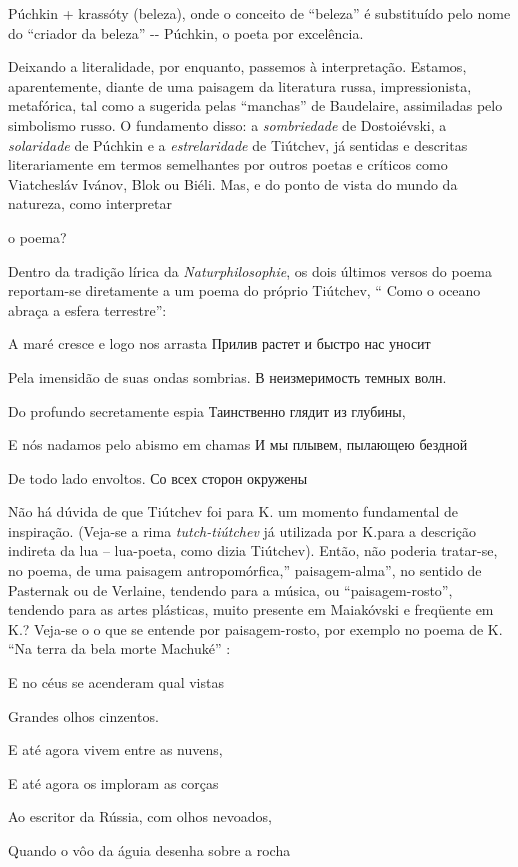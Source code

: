 Púchkin + krassóty (beleza), onde o conceito de ``beleza'' é substituído
pelo nome do ``criador da beleza'' -\/- Púchkin, o poeta por excelência.

Deixando a literalidade, por enquanto, passemos à interpretação.
Estamos, aparentemente, diante de uma paisagem da literatura russa,
impressionista, metafórica, tal como a sugerida pelas ``manchas'' de
Baudelaire, assimiladas pelo simbolismo russo. O fundamento disso: a
\emph{sombriedade} de Dostoiévski, a \emph{solaridade} de Púchkin e a
\emph{estrelaridade} de Tiútchev, já sentidas e descritas literariamente
em termos semelhantes por outros poetas e críticos como Viatchesláv
Ivánov, Blok ou Biéli. Mas, e do ponto de vista do mundo da natureza,
como interpretar

o poema?

Dentro da tradição lírica da \emph{Naturphilosophie}, os dois últimos
versos do poema reportam-se diretamente a um poema do próprio Tiútchev,
`` Como o oceano abraça a esfera terrestre'':

A maré cresce e logo nos arrasta Прилив растет и быстро нас уносит

Pela imensidão de suas ondas sombrias. В неизмеримость темных волн.

Do profundo secretamente espia Таинственно глядит из глубины,

E nós nadamos pelo abismo em chamas И мы плывем, пылающею бездной

De todo lado envoltos. Со всех сторон окружены

Não há dúvida de que Tiútchev foi para K. um momento fundamental de
inspiração. (Veja-se a rima \emph{tutch-tiútchev} já utilizada por
K.para a descrição indireta da lua -- lua-poeta, como dizia Tiútchev).
Então, não poderia tratar-se, no poema, de uma paisagem
antropomórfica,'' paisagem-alma'', no sentido de Pasternak ou de
Verlaine, tendendo para a música, ou ``paisagem-rosto'', tendendo para
as artes plásticas, muito presente em Maiakóvski e freqüente em K.?
Veja-se o o que se entende por paisagem-rosto, por exemplo no poema de
K. ``Na terra da bela morte Machuké'' :

E no céus se acenderam qual vistas

Grandes olhos cinzentos.

E até agora vivem entre as nuvens,

E até agora os imploram as corças

Ao escritor da Rússia, com olhos nevoados,

Quando o vôo da águia desenha sobre a rocha

